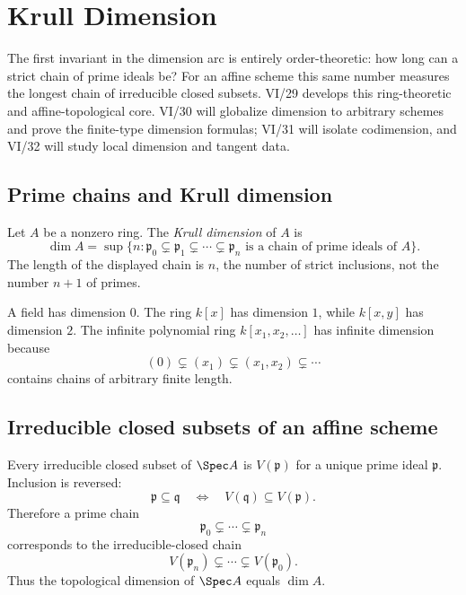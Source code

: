 \chapter{Krull Dimension}\label{ch:vi29-krull-dimension}

The first invariant in the dimension arc is entirely order-theoretic: how long can a strict chain of prime ideals be?
For an affine scheme this same number measures the longest chain of irreducible closed subsets.  VI/29 develops this
ring-theoretic and affine-topological core.  VI/30 will globalize dimension to arbitrary schemes and prove the
finite-type dimension formulas; VI/31 will isolate codimension, and VI/32 will study local dimension and tangent data.

\section{Prime chains and Krull dimension}
\begin{definition}\label{def:vi29-krull-dimension}
Let $A$ be a nonzero ring.  The \emph{Krull dimension} of $A$ is
\[
\dim A=\sup\{n:\mathfrak p_0\subsetneq\mathfrak p_1\subsetneq\cdots\subsetneq\mathfrak p_n
\text{ is a chain of prime ideals of }A\}.
\]
The length of the displayed chain is $n$, the number of strict inclusions, not the number $n+1$ of primes.
\end{definition}

A field has dimension $0$.  The ring $k[x]$ has dimension $1$, while $k[x,y]$ has dimension $2$.
The infinite polynomial ring $k[x_1,x_2,\ldots]$ has infinite dimension because
\[
(0)\subsetneq(x_1)\subsetneq(x_1,x_2)\subsetneq\cdots
\]
contains chains of arbitrary finite length.



\section{Irreducible closed subsets of an affine scheme}
Every irreducible closed subset of $\Spec A$ is $V(\mathfrak p)$ for a unique prime ideal $\mathfrak p$.  Inclusion is
reversed:
\[
\mathfrak p\subseteq\mathfrak q\quad\Longleftrightarrow\quad V(\mathfrak q)\subseteq V(\mathfrak p).
\]
Therefore a prime chain
\[
\mathfrak p_0\subsetneq\cdots\subsetneq\mathfrak p_n
\]
corresponds to the irreducible-closed chain
\[
V(\mathfrak p_n)\subsetneq\cdots\subsetneq V(\mathfrak p_0).
\]
Thus the topological dimension of $\Spec A$ equals $\dim A$.

